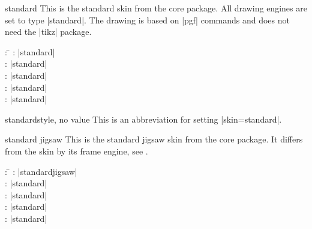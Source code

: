 \begin{docSkin}{standard}
  This is the standard skin from the core package. All drawing engines
  are set to type |standard|. The drawing is based on |pgf| commands and
  does not need the |tikz| package.
\begin{tcolorbox}[skintable=standard]
  \begin{tabbing}
    : \=\kill
    :           \> |standard|\\
    : \> |standard|\\ 
    :        \> |standard|\\
    :    \> |standard|\\
    :           \> |standard|
  \end{tabbing}
\end{tcolorbox}
\end{docSkin}

\begin{docTcbKey}{standard}{}{style, no value}
  This is an abbreviation for setting |skin=standard|.
\end{docTcbKey}

\begin{dispExample}
\end{dispExample}

\clearpage

\begin{docSkin}{standard jigsaw}
  This is the standard jigsaw skin from the core package. It differs from
  the skin  by its frame engine, see .
\begin{tcolorbox}[skintable=standard jigsaw]
  \begin{tabbing}
    : \=\kill
    :           \> |standardjigsaw|\\
    : \> |standard|\\ 
    :        \> |standard|\\
    :    \> |standard|\\
    :           \> |standard|
  \end{tabbing}
\end{tcolorbox}
\end{docSkin}

